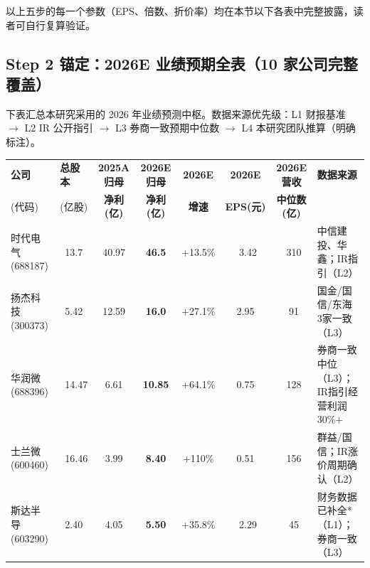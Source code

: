 \vspace{0.3em}

以上五步的每一个参数（EPS、倍数、折价率）均在本节以下各表中完整披露，读者可自行复算验证。

\subsection{Step 2 锚定：2026E 业绩预期全表（10 家公司完整覆盖）}

下表汇总本研究采用的 2026 年业绩预测中枢。数据来源优先级：L1 财报基准 $\rightarrow$ L2 IR 公开指引 $\rightarrow$ L3 券商一致预期中位数 $\rightarrow$ L4 本研究团队推算（明确标注）。

\begin{exhibitbox}
\centering
\small
\setlength{\tabcolsep}{3pt}
\begin{tabularx}{\textwidth}{>{\hsize=0.9\hsize}X >{\hsize=0.65\hsize}X c c c c c >{\hsize=1.2\hsize}X}
\toprule
\centering\textbf{公司} & \centering\textbf{总股本} & \textbf{2025A 归母} & \textbf{2026E 归母} & \textbf{2026E} & \textbf{2026E} & \textbf{2026E 营收} & \centering\arraybackslash\textbf{数据来源} \\
\centering (代码) & \centering (亿股) & \textbf{净利(亿)} & \textbf{净利(亿)} & \textbf{增速} & \textbf{EPS(元)} & \textbf{中位数(亿)} & \\
\midrule
\rowcolor{riskgreen!5}
\centering 时代电气 \newline \scriptsize(688187) & \centering ~13.7 & 40.97 & \textbf{46.5} & +13.5\% & ~3.42 & ~310 & 中信建投、华鑫；IR指引（L2）\\
\midrule
\rowcolor{riskgreen!5}
\centering 扬杰科技 \newline \scriptsize(300373) & \centering ~5.42 & 12.59 & \textbf{16.0} & +27.1\% & 2.95 & ~91 & 国金/国信/东海 3家一致（L3）\\
\midrule
\rowcolor{riskamber!5}
\centering 华润微 \newline \scriptsize(688396) & \centering ~14.47 & 6.61 & \textbf{10.85} & +64.1\% & 0.75 & ~128 & 券商一致中位（L3）；IR指引经营利润30\%+\\
\midrule
\rowcolor{riskamber!5}
\centering 士兰微 \newline \scriptsize(600460) & \centering ~16.46 & 3.99 & \textbf{8.40} & +110\% & 0.51 & ~156 & 群益/国信；IR涨价周期确认（L2）\\
\midrule
\rowcolor{riskamber!5}
\centering 斯达半导 \newline \scriptsize(603290) & \centering ~2.40 & 4.05 & \textbf{5.50} & +35.8\% & ~2.29 & ~45 & 财务数据已补全*（L1）；券商一致（L3）\\

\end{tabularx}
\end{exhibitbox}
